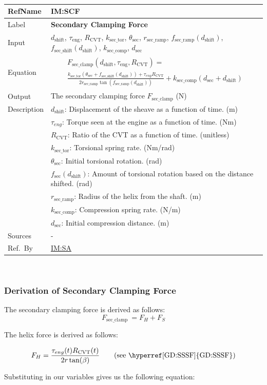 \documentclass[12pt]{article}
\newcommand{\colAwidth}{0.13\textwidth}
\newcommand{\colBwidth}{0.82\textwidth}
\newcommand{\hpref}[1]{\hyperref[#1]{#1}}
\newcommand{\definstance}[8] {
~\newline
\noindent
\begin{minipage}{\textwidth}
\renewcommand*{\arraystretch}{1.5}
\begin{tabular}{| p{\colAwidth} | p{\colBwidth}|}
  \hline
  \rowcolor[gray]{0.9}
  RefName& \textbf{#1} \label{#1}\\
  \hline
  Label& \bf #2 \\
  \hline
  Input& #3\\
  \hline
  Equation& #4\\
  \hline
  Output& #5\\
  \hline
  Description& #6 \\
  \hline
  Sources& #7 \\
  \hline
  Ref.\ By & #8\\
  \hline
\end{tabular}
\end{minipage}\\
}
\begin{document}
\definstance
{IM:SCF}
{Secondary Clamping Force}
{$d_\text{shift}$, $\tau_\text{eng}$, $R_{\text{CVT}}$, $k_{\text{sec\_tor}}$, $\theta_{\text{sec}}$, $r_{\text{sec\_ramp}}$, $f_{\text{sec\_ramp}}(d_{\text{shift}})$, $f_{\text{sec\_shift}}(d_{\text{shift}})$, $k_{\text{sec\_comp}}$, $d_{\text{sec}}$} %
{
  \begin{multline*}
    F_{\text{sec\_clamp}}(d_\text{shift}, \tau_\text{eng}, R_{\text{CVT}}) = \\
  \frac{k_{\text{sec\_tor}} (\theta_{\text{sec}} + f_{\text{sec\_shift}}(d_\text{shift})) + \tau_{eng} R_{\text{CVT}}}{2 r_{\text{sec\_ramp}} \tan(f_{\text{sec\_ramp}}(d_{\text{shift}}))} + k_{\text{sec\_comp}} (d_{\text{sec}} + d_{\text{shift}})
  \end{multline*}
} %
{The secondary clamping force $F_{\text{sec\_clamp}}$ (N)} %
{
  $d_{\text{shift}}$: Displacement of the sheave as a function of time. (m)\\
  &$\tau_{eng}$: Torque seen at the engine as a function of time. (Nm) \\
  &$R_{\text{CVT}}$: Ratio of the CVT as a function of time. (unitless) \\
  &$k_{\text{sec\_tor}}$: Torsional spring rate. (Nm/rad)\\
  &$\theta_{\text{sec}}$: Initial torsional rotation. (rad)\\
  &$f_{\text{sec}}(d_{\text{shift}})$: Amount of torsional rotation based on the distance shifted. (rad) \\
  &$r_{\text{sec\_ramp}}$: Radius of the helix from the shaft. (m)\\
  &$k_{\text{sec\_comp}}$: Compression spring rate. (N/m)\\
  &$d_{\text{sec}}$: Initial compression distance. (m)
} %
{-} %
{\hpref{IM:SA}}

\subsubsection*{Derivation of Secondary Clamping Force}

The secondary clamping force is derived as follows:
\[
F_{\text{sec\_clamp}}\ = F_H + F_S
\]

The helix force is derived as follows:

\[
F_H = \frac{\tau_{eng}(t) R_{\text{CVT}}(t)}{2r\tan(\beta)}  \tag*{\text{(see \hpref{GD:SSSF})}} %
\]

Substituting in our variables gives us the following equation:
\end{document}
